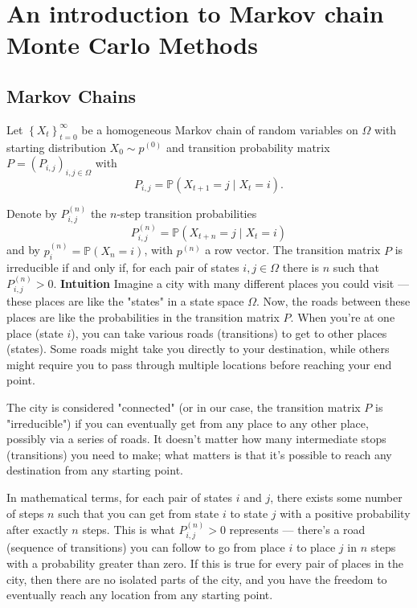 \documentclass{article}
\begin{document}
\section{An introduction to Markov chain Monte Carlo Methods}
\subsection{Markov Chains}
Let $\left\{X_t\right\}_{t=0}^{\infty}$ be a homogeneous Markov chain of random variables on $\Omega$ with starting distribution $X_0 \sim p^{(0)}$ and transition probability matrix $P=\left(P_{i, j}\right)_{i, j \in \Omega}$ with
$$
P_{i, j}=\mathbb{P}\left(X_{t+1}=j \mid X_t=i\right) .
$$

Denote by $P_{i, j}^{(n)}$ the $n$-step transition probabilities
$$
P_{i, j}^{(n)}=\mathbb{P}\left(X_{t+n}=j \mid X_t=i\right)
$$
and by $p_i^{(n)}=\mathbb{P}\left(X_n=i\right)$, with $p^{(n)}$ a row vector.
The transition matrix $P$ is irreducible if and only if, for each pair of states $i, j \in \Omega$ there is $n$ such that $P_{i, j}^{(n)}>0$. 
\newline
\textbf{Intuition} \newline
Imagine a city with many different places you could visit — these places are like the "states" in a state space \( \Omega \). Now, the roads between these places are like the probabilities in the transition matrix \( P \). When you're at one place (state \( i \)), you can take various roads (transitions) to get to other places (states). Some roads might take you directly to your destination, while others might require you to pass through multiple locations before reaching your end point.

The city is considered "connected" (or in our case, the transition matrix \( P \) is "irreducible") if you can eventually get from any place to any other place, possibly via a series of roads. It doesn't matter how many intermediate stops (transitions) you need to make; what matters is that it's possible to reach any destination from any starting point. 

In mathematical terms, for each pair of states \( i \) and \( j \), there exists some number of steps \( n \) such that you can get from state \( i \) to state \( j \) with a positive probability after exactly \( n \) steps. This is what \( P_{i, j}^{(n)}>0 \) represents — there's a road (sequence of transitions) you can follow to go from place \( i \) to place \( j \) in \( n \) steps with a probability greater than zero. If this is true for every pair of places in the city, then there are no isolated parts of the city, and you have the freedom to eventually reach any location from any starting point.
\end{document}

